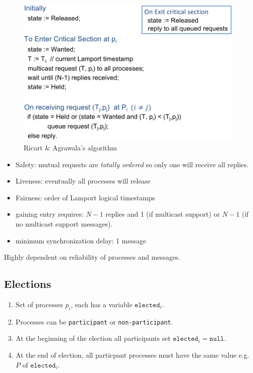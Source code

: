 \documentclass[twocolumn,landscape,10pt]{article}
\theoremstyle{definition}
\begin{document}
\begin{figure}
  	\includegraphics[scale=0.30]{ricart.png}
  	\centering
    \caption{Ricart \& Agrawala's algorithm}\label{fig:ricart}
\end{figure}


\begin{itemize}
    \item Safety: mutual requests are \emph{totally ordered} so only one will
        receive all replies.
    \item Liveness: eventually all processes will release
    \item Fairness: order of Lamport logical timestamps
\end{itemize} 


\begin{itemize}
    \item gaining entry requires: $N-1$ replies and 1 (if multicast support) or
        $N-1$ (if no multicast support messages).
    \item minimum synchronization delay: 1 message
\end{itemize} 


Highly dependent on reliability of processes and messages.


\subsection{Elections}

\begin{enumerate}
    \item Set of processes $p_i$, each has a variable $\texttt{elected}_i$.
    \item Processes can be \texttt{participant} or \texttt{non-participant}.
    \item At the beginning of the election all participants set
        $\texttt{elected}_i=\texttt{null}$.
    \item At the end of election, all particpant processes must have the same
        value e.g. $P$ of $\texttt{elected}_i$.
\end{enumerate} 
\end{document}
